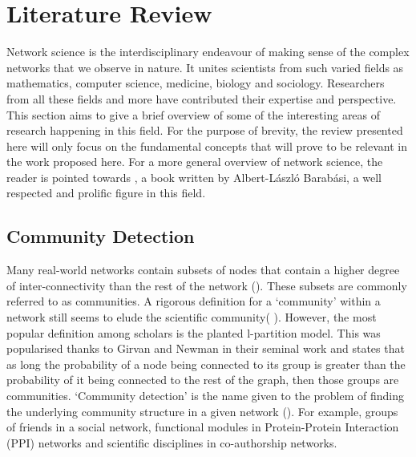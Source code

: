 \documentclass[
11pt, %
english, %
singlespacing, %
headsepline, %
]{MastersDoctoralThesis} %
\begin{document}
\chapter{Literature Review}
Network science is the interdisciplinary endeavour of making sense of the complex networks that we observe in nature. It unites scientists from such varied fields as mathematics, computer science, medicine, biology and sociology. Researchers from all these fields and more have contributed their expertise and perspective. This section aims to give a brief overview of some of the interesting areas of research happening in this field. For the purpose of brevity, the review presented here will only focus on the fundamental concepts that will prove to be relevant in the work proposed here. For a more general overview of network science, the reader is pointed towards \cite{barabasi2002linked}, a book written by Albert-L{\'a}szl{\'o} Barab{\'a}si, a well respected and prolific figure in this field.

\section{Community Detection}

Many real-world networks contain subsets of nodes that contain a higher degree of inter-connectivity than the rest of the network
(\cite{girvan2002community,palla2005uncovering,lancichinetti2009detecting}).
These subsets are commonly referred to as communities. 
A rigorous definition for a `community' within a network still seems to elude the scientific community( \cite{lancichinetti2009detecting}).
However, the most popular definition among scholars is the planted l-partition model.
This was popularised thanks to Girvan and Newman in their seminal work \cite{girvan2002community} and states that as long the probability of a node being connected to its group is greater than the probability of it being connected to the rest of the graph, then those groups are communities. 
`Community detection' is the name given to the problem of finding the underlying community structure in a given network (\cite{girvan2002community}). 
For example, groups of friends in a social network, functional modules in Protein-Protein Interaction (PPI) networks and scientific disciplines in co-authorship networks.

\end{document}
